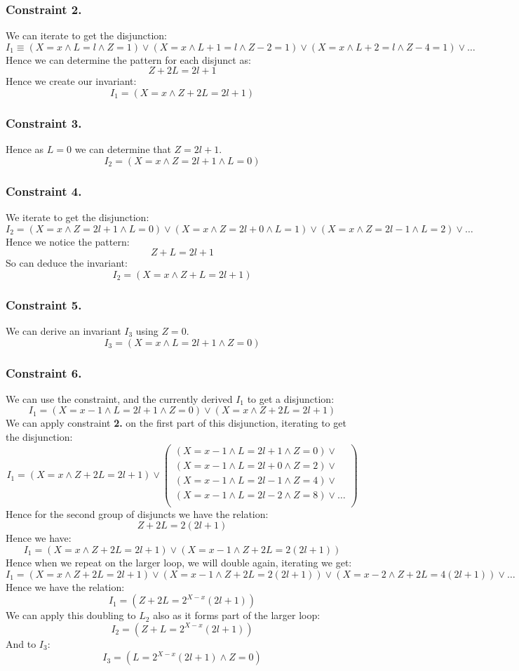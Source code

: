 \subsubsection*{Constraint 2.}
We can iterate to get the disjunction:
\[I_1 \equiv (X=x \land L=l \land Z = 1) \lor (X=x \land L+1 = l \land Z-2 = 1) \lor (X=x \land L+2 = l \land Z - 4 = 1) \lor \dots\]
Hence we can determine the pattern for each disjunct as:
\[Z + 2L = 2l + 1\]
Hence we create our invariant:
\[I_1 = (X = x \land Z + 2L = 2l + 1)\]
\subsubsection*{Constraint 3.}
Hence as $L=0$ we can determine that $Z = 2l + 1$.
\[I_2 = (X=x \land Z = 2l + 1 \land L = 0)\]
\subsubsection*{Constraint 4.}
We iterate to get the disjunction:
\[I_2 = (X = x  \land Z = 2l + 1 \land L = 0) \lor (X = x  \land Z = 2l + 0 \land L = 1) \lor (X = x  \land Z = 2l - 1 \land L = 2) \lor \dots\]
Hence we notice the pattern:
\[Z + L = 2l + 1\]
So can deduce the invariant:
\[I_2 = (X = x \land Z + L = 2l + 1)\]
\subsubsection*{Constraint 5.}
We can derive an invariant $I_3$ using $Z = 0$.
\[I_3 = (X=x \land L = 2l + 1 \land Z = 0)\]
\subsubsection*{Constraint 6.}
We can use the constraint, and the currently derived $I_1$ to get a disjunction:
\[I_1 = (X=x-1 \land L = 2l + 1 \land Z = 0) \lor (X = x \land Z + 2L = 2l + 1)\]
We can apply constraint \textbf{2.} on the first part of this disjunction, iterating to get the disjunction:
\[I_1 = (X = x \land Z + 2L = 2l + 1) \lor \left( \begin{matrix}
            (X=x-1 \land L = 2l + 1 \land Z = 0) \lor     \\
            (X=x-1 \land L = 2l + 0 \land Z = 2) \lor     \\
            (X=x-1 \land L = 2l-1 \land Z = 4) \lor       \\
            (X=x-1 \land L = 2l-2 \land Z = 8) \lor \dots \\
        \end{matrix} \right)\]
Hence for the second group of disjuncts we have the relation:
\[Z + 2L = 2(2l + 1)\]
Hence we have:
\[I_1 = (X = x \land Z + 2L = 2l + 1) \lor (X=x-1 \land Z + 2L = 2(2l + 1))\]
Hence when we repeat on the larger loop, we will double again, iterating we get:
\[I_1 = (X = x \land Z + 2L = 2l + 1) \lor (X=x-1 \land Z + 2L = 2(2l + 1)) \lor (X=x-2 \land Z + 2L = 4(2l + 1)) \lor \dots\]
Hence we have the relation:
\[I_1 = (Z + 2L = 2^{X - x}(2l + 1))\]
We can apply this doubling to $L_2$ also as it forms part of the larger loop:
\[I_2 = (Z + L = 2^{X - x}(2l + 1))\]
And to $I_3$:
\[I_3 = (L = 2^{X-x}(2l + 1) \land Z = 0)\]

